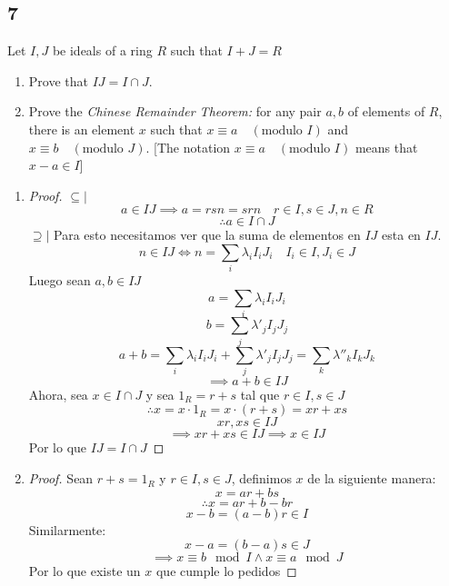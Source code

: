 \documentclass[11pt]{article}
\theoremstyle{definition}
\begin{document}
        \subsection{7}
        Let $I,J$ be ideals of a ring $R$ such that $I+J=R$
        \begin{enumerate}[label=\textbf{(\alph*)}]
            \item Prove that $IJ=I\cap J$.

            \item Prove the \textit{Chinese Remainder Theorem:} for any pair $a,b$ of elements of $R$, there is an element $x$ such that $x\equiv a\quad(\textrm{modulo }I)$ and $x\equiv b\quad(\textrm{modulo }J)$. [The notation $x\equiv a\quad(\textrm{modulo }I)$ means that $x-a\in I$]
        \end{enumerate}
        \begin{enumerate}[label=\textbf{(\alph*)}]
            \item \begin{proof}
                \underline{$\subseteq|$}
                \[a\in IJ\implies a=rsn=srn\quad r\in I,s\in J,n\in R\]
                \[\therefore a\in I\cap J\]
                \underline{$\supseteq|$} Para esto necesitamos ver que la suma de elementos en $IJ$ esta en $IJ$.
                \[n\in IJ\iff n=\sum_i \lambda_iI_iJ_i\quad I_i\in I,J_i\in J\]
                Luego sean $a,b\in IJ$
                \[a=\sum_i\lambda_iI_iJ_i\]
                \[b=\sum_j\lambda'_jI_jJ_j\]
                \[a+b=\sum_i\lambda_iI_iJ_i+\sum_j\lambda'_jI_jJ_j=\sum_k\lambda''_kI_kJ_k\]
                \[\implies a+b\in IJ\]
                Ahora, sea $x\in I\cap J$ y sea $1_R=r+s$ tal que $r\in I, s\in J$
                \[\therefore x=x\cdot 1_R=x\cdot (r+s)=xr+xs\]
                \[xr,xs\in IJ\]
                \[\implies xr+xs\in IJ\implies x\in IJ\]
                Por lo que $IJ=I\cap J$
            \end{proof}

            \item \begin{proof}
                Sean $r+s=1_R$ y $r\in I, s\in J$, definimos $x$ de la siguiente manera:
                \[x=ar+bs\]
                \[\therefore x=ar+b-br\]
                \[x-b=(a-b)r\in I\]
                Similarmente:
                \[x-a=(b-a)s\in J\]
                \[\implies x\equiv b\mod I\wedge x\equiv a\mod J\]
                Por lo que existe un $x$ que cumple lo pedidos
            \end{proof}
        \end{enumerate}
    
\end{document}
